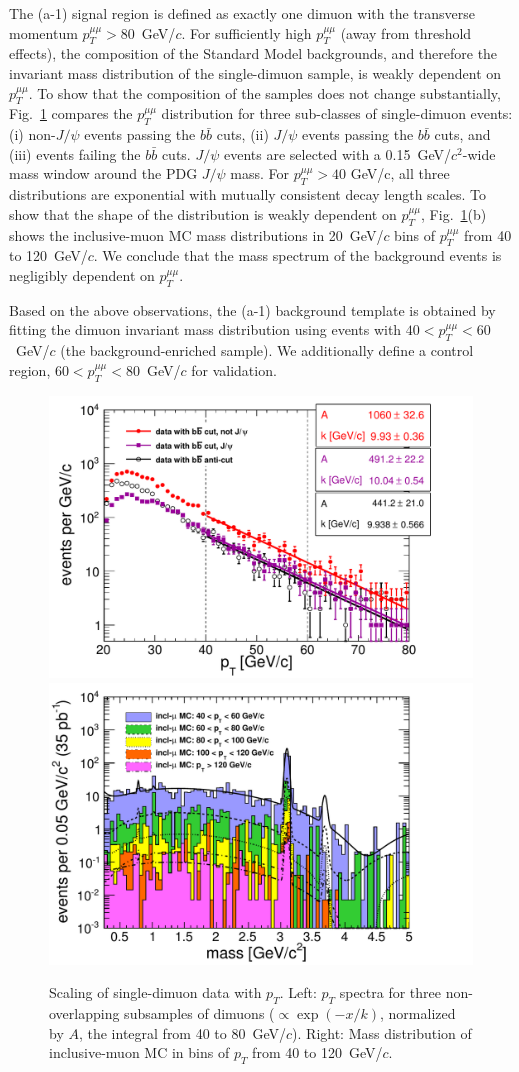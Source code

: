 The (a-1) signal region is defined as exactly one dimuon with the
transverse momentum $p_T^{\mu\mu} > 80$~GeV/$c$. For sufficiently high
$p_T^{\mu\mu}$ (away from threshold effects), the composition of the
Standard Model backgrounds, and therefore the invariant mass
distribution of the single-dimuon sample, is weakly dependent on
$p_T^{\mu\mu}$. To show that the composition of the samples does not
change substantially, Fig.~\ref{fig:support_bbbarcut_limits} compares
the $p_T^{\mu\mu}$ distribution for three sub-classes of single-dimuon
events: (i) non-$J/\psi$ events passing the $b\bar{b}$ cuts, (ii)
$J/\psi$ events passing the $b\bar{b}$ cuts, and (iii) events failing
the $b\bar{b}$ cuts. $J/\psi$ events are selected with a
0.15~GeV/$c^2$-wide mass window around the PDG $J/\psi$ mass. For
$p_T^{\mu\mu}>40$ GeV/c, all three distributions are exponential with
mutually consistent decay length scales.  To show that the shape of
the distribution is weakly dependent on $p_T^{\mu\mu}$,
Fig.~\ref{fig:support_bbbarcut_limits}(b) shows the inclusive-muon MC
mass distributions in 20~GeV/$c$ bins of $p_T^{\mu\mu}$ from 40 to
120~GeV/$c$. We conclude that the mass spectrum of the
background events is negligibly dependent on $p_T^{\mu\mu}$.

Based on the above observations, the (a-1) background template is
obtained by fitting the dimuon invariant mass distribution using
events with $40 < p_T^{\mu\mu} < 60$~GeV/$c$ (the background-enriched
sample). We additionally define a control region, $60 < p_T^{\mu\mu} <
80$~GeV/$c$ for validation.

\begin{figure}
\includegraphics[width=0.50\linewidth]{PLOTS/support_bbbarcut_limits.pdf}
\includegraphics[width=0.50\linewidth]{PLOTS/support_mass_vs_pt.pdf}
\caption{Scaling of single-dimuon data with $p_T$.  Left: $p_T$
  spectra for three non-overlapping subsamples of dimuons ($\propto
  \exp(-x/k)$, normalized by $A$, the integral from 40 to 80~GeV/$c$).
  Right: Mass distribution of inclusive-muon MC in bins of $p_T$ from
  40 to 120~GeV/$c$.  \label{fig:support_bbbarcut_limits}}
\end{figure}

